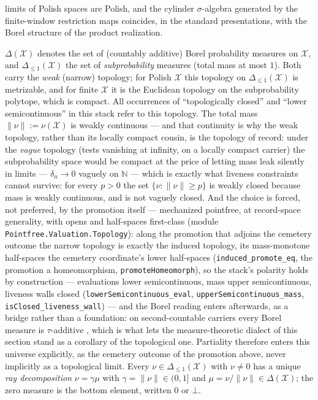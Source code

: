 \begin{definition}
\begin{itemize}
  limits of Polish spaces are Polish, and the cylinder
  $\sigma$-algebra generated by the finite-window restriction maps
  coincides, in the standard presentations, with the Borel
  structure of the product realization.
\end{itemize}
$\Delta(\mathcal{X})$ denotes the set of (countably additive) Borel
probability measures on $\mathcal{X}$, and
$\Delta_{\le 1}(\mathcal{X})$ the set of \emph{subprobability}
measures (total mass at most $1$). Both carry the \emph{weak}
(narrow) topology; for Polish $\mathcal{X}$ this topology on
$\Delta_{\le 1}(\mathcal{X})$ is metrizable, and for finite
$\mathcal{X}$ it is the Euclidean topology on the subprobability
polytope, which is compact. All occurrences of ``topologically
closed'' and ``lower semicontinuous'' in this stack refer to this
topology. The total mass $\|\nu\| := \nu(\mathcal{X})$ is weakly
continuous --- and that continuity is why the weak topology, rather
than its locally compact cousin, is the topology of record: under
the \emph{vague} topology (tests vanishing at infinity, on a
locally compact carrier) the subprobability space would be compact
at the price of letting mass leak silently in limits ---
$\delta_n \to 0$ vaguely on $\mathbb{N}$ --- which is exactly what
liveness constraints cannot survive: for every $p > 0$ the set
$\{\nu : \|\nu\| \ge p\}$ is weakly closed because mass is weakly
continuous, and is not vaguely closed. And the choice is forced,
not preferred, by the promotion itself --- mechanized pointfree,
at record-space generality, with opens and half-spaces first-class
(module \texttt{Pointfree.Valuation.Topology}): along the
promotion that adjoins the cemetery outcome the narrow topology is
exactly the induced topology, its mass-monotone half-spaces the
cemetery coordinate's lower half-spaces
(\texttt{induced\_promote\_eq}, the promotion a homeomorphism,
\texttt{promoteHomeomorph}), so the stack's polarity holds by
construction --- evaluations lower semicontinuous, mass upper
semicontinuous, liveness walls closed
(\texttt{lowerSemicontinuous\_eval},
\texttt{upperSemicontinuous\_mass},
\texttt{isClosed\_liveness\_wall}) --- and the Borel reading
enters afterwards, as a bridge rather than a foundation: on
second-countable carriers every Borel measure is
$\tau$-additive \cite[414O]{fremlin4}, which is what lets the
measure-theoretic dialect of this section stand as a corollary of
the topological one. Partiality therefore enters
this universe explicitly, as the cemetery outcome of the promotion
above, never implicitly as a topological limit. Every
$\nu \in \Delta_{\le 1}(\mathcal{X})$ with
$\nu \ne 0$ has a unique \emph{ray decomposition}
$\nu = \gamma\mu$ with $\gamma = \|\nu\| \in (0,1]$ and
$\mu = \nu/\|\nu\| \in \Delta(\mathcal{X})$; the zero measure is the
bottom element, written $0$ or $\bot$.


\end{definition}
